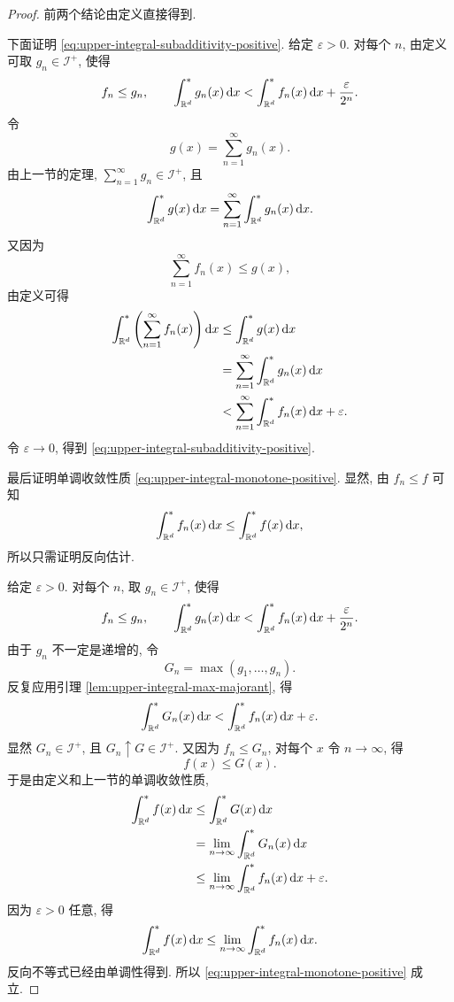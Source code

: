 \begin{proof}
	前两个结论由定义直接得到.
	
	下面证明 \eqref{eq:upper-integral-subadditivity-positive}. 给定 \(\varepsilon>0\). 对每个 \(n\), 由定义可取 \(g_n\in\mathcal I^+\), 使得
	\[
	f_n\leq g_n,
	\qquad
	\int_{\mathbb{R}^d}^{*}g_n(x)\,\dd x
	<
	\int_{\mathbb{R}^d}^{*}f_n(x)\,\dd x+\frac{\varepsilon}{2^n}.
	\]
	令
	\[
	g(x)=\sum_{n=1}^{\infty}g_n(x).
	\]
	由上一节的定理, \(\sum_{n=1}^{\infty}g_n\in\mathcal I^+\), 且
	\[
	\int_{\mathbb{R}^d}^{*}g(x)\,\dd x
	=
	\sum_{n=1}^{\infty}\int_{\mathbb{R}^d}^{*}g_n(x)\,\dd x.
	\]
	又因为
	\[
	\sum_{n=1}^{\infty}f_n(x)\leq g(x),
	\]
	由定义可得
	\begin{align*}
		\int_{\mathbb{R}^d}^{*}\left(\sum_{n=1}^{\infty}f_n(x)\right)\dd x
		&\leq
		\int_{\mathbb{R}^d}^{*}g(x)\,\dd x\\
		&=
		\sum_{n=1}^{\infty}\int_{\mathbb{R}^d}^{*}g_n(x)\,\dd x\\
		&<
		\sum_{n=1}^{\infty}\int_{\mathbb{R}^d}^{*}f_n(x)\,\dd x+\varepsilon.
	\end{align*}
	令 \(\varepsilon\to0\), 得到 \eqref{eq:upper-integral-subadditivity-positive}.
	
	最后证明单调收敛性质 \eqref{eq:upper-integral-monotone-positive}. 显然, 由 \(f_n\leq f\) 可知
	\[
	\int_{\mathbb{R}^d}^{*}f_n(x)\,\dd x
	\leq
	\int_{\mathbb{R}^d}^{*}f(x)\,\dd x,
	\]
	所以只需证明反向估计.
	
	给定 \(\varepsilon>0\). 对每个 \(n\), 取 \(g_n\in\mathcal I^+\), 使得
	\[
	f_n\leq g_n,
	\qquad
	\int_{\mathbb{R}^d}^{*}g_n(x)\,\dd x
	<
	\int_{\mathbb{R}^d}^{*}f_n(x)\,\dd x+\frac{\varepsilon}{2^n}.
	\]
	由于 \(g_n\) 不一定是递增的, 令
	\[
	G_n=\max(g_1,\ldots,g_n).
	\]
	反复应用引理 \ref{lem:upper-integral-max-majorant}, 得
	\begin{equation}
		\int_{\mathbb{R}^d}^{*}G_n(x)\,\dd x
		<
		\int_{\mathbb{R}^d}^{*}f_n(x)\,\dd x+
		\varepsilon.
		\label{eq:Gn-majorant-estimate}
	\end{equation}
	显然 \(G_n\in\mathcal I^+\), 且 \(G_n\uparrow G\in\mathcal I^+\). 又因为 \(f_n\leq G_n\), 对每个 \(x\) 令 \(n\to\infty\), 得
	\[
	f(x)\leq G(x).
	\]
	于是由定义和上一节的单调收敛性质,
	\begin{align*}
		\int_{\mathbb{R}^d}^{*}f(x)\,\dd x
		&\leq
		\int_{\mathbb{R}^d}^{*}G(x)\,\dd x\\
		&=
		\lim_{n\to\infty}
		\int_{\mathbb{R}^d}^{*}G_n(x)\,\dd x\\
		&\leq
		\lim_{n\to\infty}
		\int_{\mathbb{R}^d}^{*}f_n(x)\,\dd x+
		\varepsilon.
	\end{align*}
	因为 \(\varepsilon>0\) 任意, 得
	\[
	\int_{\mathbb{R}^d}^{*}f(x)\,\dd x
	\leq
	\lim_{n\to\infty}
	\int_{\mathbb{R}^d}^{*}f_n(x)\,\dd x.
	\]
	反向不等式已经由单调性得到. 所以 \eqref{eq:upper-integral-monotone-positive} 成立.
\end{proof}

